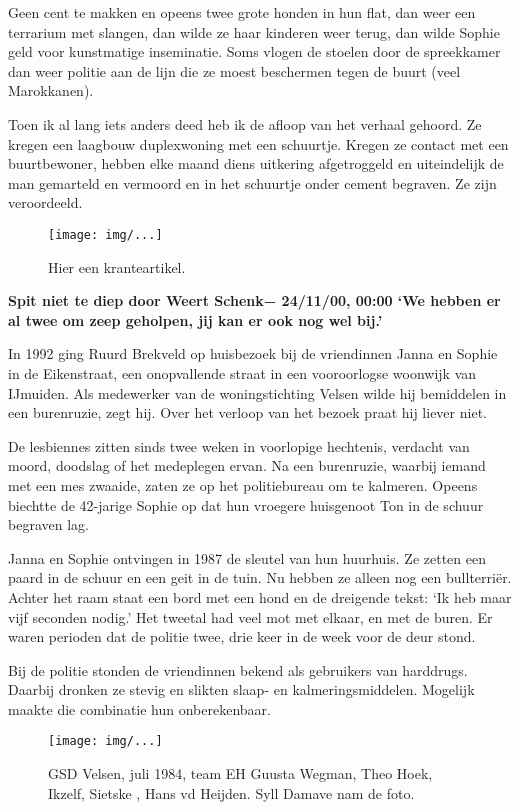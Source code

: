 \documentclass[10pt,twoside,openright]{memoir}
\begin{document}
Geen cent te makken en opeens twee grote honden in hun flat, dan weer een terrarium met slangen, dan wilde ze haar kinderen weer terug, dan wilde Sophie geld voor kunstmatige inseminatie. Soms vlogen de stoelen door de spreekkamer dan weer politie aan de lijn die ze moest beschermen tegen de buurt (veel Marokkanen). 

Toen ik al lang iets anders deed heb ik de afloop van het verhaal gehoord. Ze kregen een laagbouw duplexwoning met een schuurtje. Kregen ze contact met een buurtbewoner, hebben elke maand diens uitkering afgetroggeld en uiteindelijk de man gemarteld en vermoord en in het schuurtje onder cement begraven. Ze zijn veroordeeld. 

\begin{figure}[t]
\texttt{[image: img/...]}
\caption{Hier een kranteartikel.}
\end{figure}

\textbf{Spit niet te diep
door Weert Schenk− 24/11/00, 00:00
`We hebben er al twee om zeep geholpen, jij kan er ook nog wel bij.'}

In 1992 ging Ruurd Brekveld op huisbezoek bij de vriendinnen Janna en Sophie in de Eikenstraat, een onopvallende straat in een vooroorlogse woonwijk van IJmuiden. Als medewerker van de woningstichting Velsen wilde hij bemiddelen in een burenruzie, zegt hij. Over het verloop van het bezoek praat hij liever niet.

De lesbiennes zitten sinds twee weken in voorlopige hechtenis, verdacht van moord, doodslag of het medeplegen ervan. Na een burenruzie, waarbij iemand met een mes zwaaide, zaten ze op het politiebureau om te kalmeren. Opeens biechtte de 42-jarige Sophie op dat hun vroegere huisgenoot Ton in de schuur begraven lag.

Janna en Sophie ontvingen in 1987 de sleutel van hun huurhuis. Ze zetten een paard in de schuur en een geit in de tuin. Nu hebben ze alleen nog een bullterriër. Achter het raam staat een bord met een hond en de dreigende tekst: `Ik heb maar vijf seconden nodig.' Het tweetal had veel mot met elkaar, en met de buren. Er waren perioden dat de politie twee, drie keer in de week voor de deur stond.

Bij de politie stonden de vriendinnen bekend als gebruikers van harddrugs. Daarbij dronken ze stevig en slikten slaap- en kalmeringsmiddelen. Mogelijk maakte die combinatie hun onberekenbaar.

\begin{figure}[t]
\texttt{[image: img/...]}
\caption{GSD Velsen, juli 1984, team EH Guusta Wegman, Theo Hoek, Ikzelf, Sietske , Hans vd Heijden. Syll Damave nam de foto.}
\end{figure}
\end{document}
